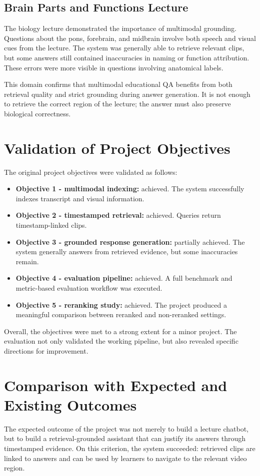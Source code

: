 \documentclass[12pt,a4paper,oneside]{report}
\begin{document}
\subsection{Brain Parts and Functions Lecture}
The biology lecture demonstrated the importance of multimodal grounding. Questions about the pons, forebrain, and midbrain involve both speech and visual cues from the lecture. The system was generally able to retrieve relevant clips, but some answers still contained inaccuracies in naming or function attribution. These errors were more visible in questions involving anatomical labels.

This domain confirms that multimodal educational QA benefits from both retrieval quality and strict grounding during answer generation. It is not enough to retrieve the correct region of the lecture; the answer must also preserve biological correctness.

\section{Validation of Project Objectives}
The original project objectives were validated as follows:
\begin{itemize}
    \item \textbf{Objective 1 - multimodal indexing:} achieved. The system successfully indexes transcript and visual information.
    \item \textbf{Objective 2 - timestamped retrieval:} achieved. Queries return timestamp-linked clips.
    \item \textbf{Objective 3 - grounded response generation:} partially achieved. The system generally answers from retrieved evidence, but some inaccuracies remain.
    \item \textbf{Objective 4 - evaluation pipeline:} achieved. A full benchmark and metric-based evaluation workflow was executed.
    \item \textbf{Objective 5 - reranking study:} achieved. The project produced a meaningful comparison between reranked and non-reranked settings.
\end{itemize}

Overall, the objectives were met to a strong extent for a minor project. The evaluation not only validated the working pipeline, but also revealed specific directions for improvement.

\section{Comparison with Expected and Existing Outcomes}
The expected outcome of the project was not merely to build a lecture chatbot, but to build a retrieval-grounded assistant that can justify its answers through timestamped evidence. On this criterion, the system succeeded: retrieved clips are linked to answers and can be used by learners to navigate to the relevant video region.
\end{document}
